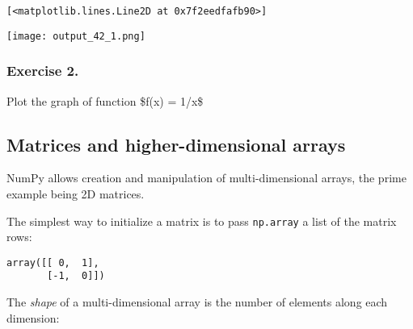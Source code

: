 \documentclass[english,serif,mathserif,xcolor=pdftex,dvipsnames,table]{beamer}
\begin{document}
\begin{verbatim}
[<matplotlib.lines.Line2D at 0x7f2eedfafb90>]
\end{verbatim}

\texttt{[image: output\_42\_1.png]}

\subsubsection{Exercise 2.}\label{exercise-2.}

Plot the graph of function \$f(x) = 1/x\$

\begin{Shaded}
\begin{Highlighting}[]
\OperatorTok{=} \OperatorTok{/}
\end{Highlighting}
\end{Shaded}

\subsection{Matrices and higher-dimensional
arrays}\label{matrices-and-higher-dimensional-arrays}

NumPy allows creation and manipulation of multi-dimensional arrays, the
prime example being 2D matrices.

The simplest way to initialize a matrix is to pass \texttt{np.array} a
list of the matrix rows:

\begin{Shaded}
\begin{Highlighting}[]
\OperatorTok{=} \NormalTok{np.array([[}\NormalTok{, }\NormalTok{], [}\OperatorTok{-}\NormalTok{, }\NormalTok{]])}
\end{Highlighting}
\end{Shaded}

\begin{Shaded}
\begin{Highlighting}[]
\end{Highlighting}
\end{Shaded}

\begin{verbatim}
array([[ 0,  1],
       [-1,  0]])
\end{verbatim}

The \emph{shape} of a multi-dimensional array is the number of elements
along each dimension:

\begin{Shaded}
\begin{Highlighting}[]
\end{Highlighting}
\end{Shaded}
\end{document}
